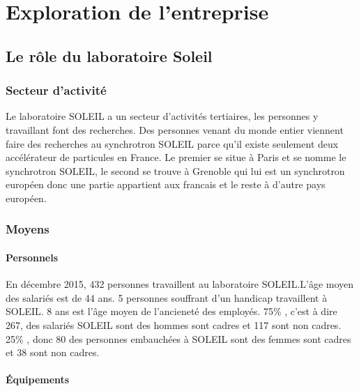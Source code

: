 \chapter{Exploration de l'entreprise}
	\minitoc






\section{Le rôle du laboratoire Soleil}

	\subsection{Secteur d'activit\'e}
				Le laboratoire SOLEIL a un secteur d'activités tertiaires, les personnes y travaillant font des recherches. 
				Des personnes venant du monde entier viennent faire des recherches au synchrotron SOLEIL parce qu'il existe seulement deux accélérateur de particules en France. Le premier se situe à Paris et se nomme le synchrotron SOLEIL, le second se trouve à Grenoble qui lui est un synchrotron européen donc une partie appartient aux francais et le reste à d'autre pays européen.
	\subsection{Moyens}
		\subsubsection{Personnels}
				En décembre 2015, 432 personnes travaillent au laboratoire SOLEIL.L'âge moyen des salariés est de 44 ans. 5 personnes souffrant d'un handicap travaillent à SOLEIL. 8 ans est l'âge moyen de l'ancieneté des employés.
				75\% , c'est à dire 267, des salariés SOLEIL sont des hommes sont cadres et 117 sont non cadres.
				25\% , donc 80 des personnes embauchées à SOLEIL sont des femmes sont cadres et 38 sont non cadres.


		\subsubsection{Équipements}
			

